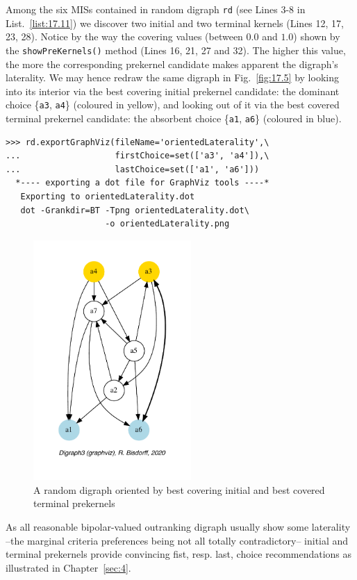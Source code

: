Among the six MISs contained in random digraph \texttt{rd} (see Lines 3-8 in List.~\vref{list:17.11}) we discover two initial and two terminal kernels (Lines 12, 17, 23, 28). Notice by the way the covering values (between $0.0$ and $1.0$) shown by the \texttt{showPreKernels()} method (Lines 16, 21, 27 and 32). The higher this value, the more the corresponding prekernel candidate makes apparent the digraph's laterality. We may hence redraw the same digraph in Fig.~\vref{fig:17.5} by looking into its interior via the best covering initial prekernel candidate: the dominant choice \{\texttt{a3}, \texttt{a4}\} (coloured in yellow), and looking out of it via the best covered terminal prekernel candidate: the absorbent choice \{\texttt{a1}, \texttt{a6}\} (coloured in blue).
\begin{lstlisting}
>>> rd.exportGraphViz(fileName='orientedLaterality',\
...                   firstChoice=set(['a3', 'a4']),\
...                   lastChoice=set(['a1', 'a6']))
  *---- exporting a dot file for GraphViz tools ----*
   Exporting to orientedLaterality.dot
   dot -Grankdir=BT -Tpng orientedLaterality.dot\
                    -o orientedLaterality.png
\end{lstlisting}
\begin{figure}[ht]
\sidecaption[t]
\includegraphics[width=6cm]{Figures/17-5-orientedLaterality.pdf}
\caption[Oriented drawing of a digraph]{A random digraph oriented by best covering initial and best covered terminal prekernels}
\label{fig:17.5}       %
\end{figure}

As all reasonable bipolar-valued outranking digraph usually show some laterality --the marginal criteria preferences being not all totally contradictory-- initial and terminal prekernels provide convincing fist, resp. last, choice recommendations as illustrated in Chapter~\vref{sec:4}.

